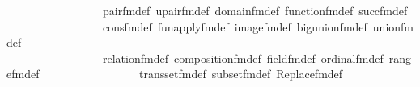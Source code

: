 \begin{isabellebody}
\ \ \ \ \ \ \ \ \ \ \ \ \ \ \ \ \ pair{\isacharunderscore}{\kern0pt}fm{\isacharunderscore}{\kern0pt}def\ upair{\isacharunderscore}{\kern0pt}fm{\isacharunderscore}{\kern0pt}def\ domain{\isacharunderscore}{\kern0pt}fm{\isacharunderscore}{\kern0pt}def\ function{\isacharunderscore}{\kern0pt}fm{\isacharunderscore}{\kern0pt}def\ succ{\isacharunderscore}{\kern0pt}fm{\isacharunderscore}{\kern0pt}def\isanewline
\ \ \ \ \ \ \ \ \ \ \ \ \ \ \ \ \ cons{\isacharunderscore}{\kern0pt}fm{\isacharunderscore}{\kern0pt}def\ fun{\isacharunderscore}{\kern0pt}apply{\isacharunderscore}{\kern0pt}fm{\isacharunderscore}{\kern0pt}def\ image{\isacharunderscore}{\kern0pt}fm{\isacharunderscore}{\kern0pt}def\ big{\isacharunderscore}{\kern0pt}union{\isacharunderscore}{\kern0pt}fm{\isacharunderscore}{\kern0pt}def\ union{\isacharunderscore}{\kern0pt}fm{\isacharunderscore}{\kern0pt}def\isanewline
\ \ \ \ \ \ \ \ \ \ \ \ \ \ \ \ \ relation{\isacharunderscore}{\kern0pt}fm{\isacharunderscore}{\kern0pt}def\ composition{\isacharunderscore}{\kern0pt}fm{\isacharunderscore}{\kern0pt}def\ field{\isacharunderscore}{\kern0pt}fm{\isacharunderscore}{\kern0pt}def\ ordinal{\isacharunderscore}{\kern0pt}fm{\isacharunderscore}{\kern0pt}def\ range{\isacharunderscore}{\kern0pt}fm{\isacharunderscore}{\kern0pt}def\isanewline
\ \ \ \ \ \ \ \ \ \ \ \ \ \ \ \ \ transset{\isacharunderscore}{\kern0pt}fm{\isacharunderscore}{\kern0pt}def\ subset{\isacharunderscore}{\kern0pt}fm{\isacharunderscore}{\kern0pt}def\ Replace{\isacharunderscore}{\kern0pt}fm{\isacharunderscore}{\kern0pt}def\isanewline
\isanewline
%
\isadelimtheory
\isanewline
%
\endisadelimtheory
%
\isatagtheory
{}\isamarkupfalse%
%
\endisatagtheory
{\isafoldtheory}%
%
\isadelimtheory
%
\endisadelimtheory
%
\end{isabellebody}%
\endinput
